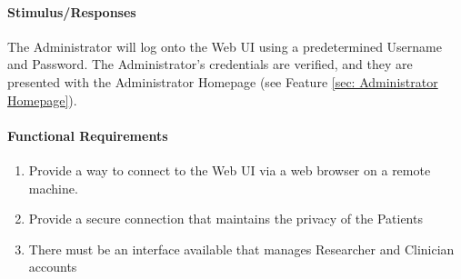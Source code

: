 \documentclass{article}
\begin{document}
\paragraph {Stimulus/Responses}
The Administrator will log onto the Web UI using a predetermined Username and Password. The Administrator's credentials are verified, and they are presented with the Administrator Homepage (see Feature \ref{sec: Administrator Homepage}).

\paragraph {Functional Requirements}
\begin{enumerate}
\item Provide a way to connect to the Web UI via a web browser on a remote machine.
\item Provide a secure connection that maintains the privacy of the Patients 
\item There must be an interface available that manages Researcher and Clinician accounts		 
\end{enumerate}
\end{document}
